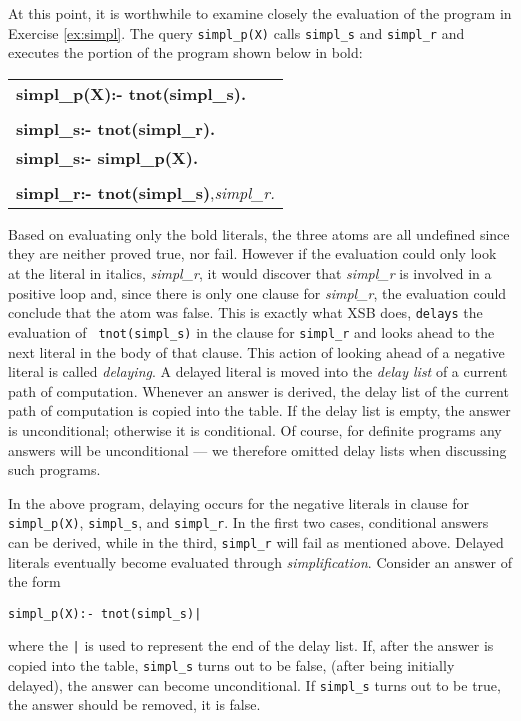 At this point, it is worthwhile to examine closely the evaluation of
the program in Exercise \ref{ex:simpl}.  The query {\tt simpl\_p(X)}
calls {\tt simpl\_s} and {\tt simpl\_r} and executes the portion of
the program shown below in bold:
\begin{center}
\begin{tabular}{l}
{\bf simpl\_p(X):- tnot(simpl\_s).} \\
\\
{\bf simpl\_s:- tnot(simpl\_r).} \\
{\bf simpl\_s:- simpl\_p(X).} \\
\\
{\bf simpl\_r:- tnot(simpl\_s)},{\it simpl\_r.}
\end{tabular}
\end{center}
Based on evaluating only the bold literals, the three atoms are all
undefined since they are neither proved true, nor fail.  However if
the evaluation could only look at the literal in italics, {\em
simpl\_r}, it would discover that {\em simpl\_r} is involved in a
positive loop and, since there is only one clause for {\em simpl\_r},
the evaluation could conclude that the atom was false.  This is
exactly what XSB does, {\tt delays} the evaluation of {\tt
tnot(simpl\_s)} in the clause for {\tt simpl\_r} and looks ahead to
the next literal in the body of that clause.  This action of looking
ahead of a negative literal is called {\em delaying}.  A delayed
literal is moved into the {\em delay list} of a current path of
computation.  Whenever an answer is derived, the delay list of the
current path of computation is copied into the table.  If the delay
list is empty, the answer is unconditional; otherwise it is
conditional.  Of course, for definite programs any answers will be
unconditional --- we therefore omitted delay lists when discussing such
programs.

In the above program, delaying occurs for the negative literals in
clause for {\tt simpl\_p(X)}, {\tt simpl\_s}, and {\tt simpl\_r}.
In the first two cases, conditional answers can be derived, while in
the third, {\tt simpl\_r} will fail as mentioned above.  Delayed
literals eventually become evaluated through {\em simplification}.
Consider an answer of the form 
\begin{verbatim}
simpl_p(X):- tnot(simpl_s)|
\end{verbatim}
where the {\tt |} is used to represent the end of the delay list.  If,
after the answer is copied into the table, {\tt simpl\_s} turns out to
be false, (after being initially delayed), the answer can become
unconditional.  If {\tt simpl\_s} turns out to be true, the answer
should be removed, it is false.

